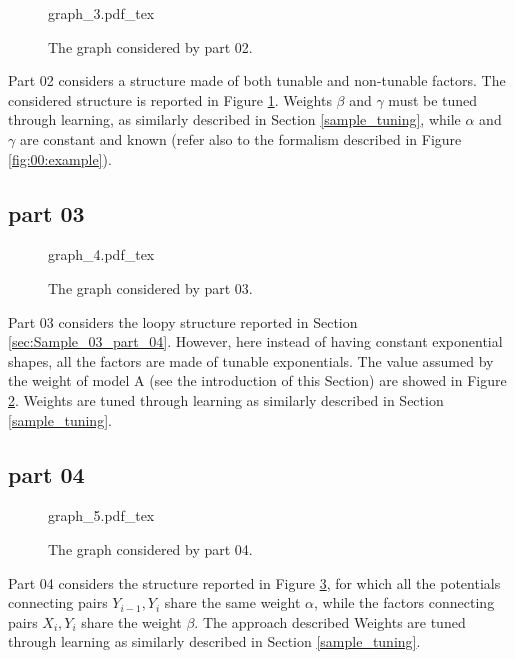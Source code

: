 \begin{figure}
	\centering
\def\svgwidth{0.5 \textwidth}
{graph_3.pdf_tex} 
\caption{The graph considered by part 02.}
\label{fig:sample_06:1}
\end{figure}

Part 02 considers a structure made of both tunable and non-tunable factors. The considered structure is reported in Figure \ref{fig:sample_06:1}.
Weights $\beta$ and $\gamma$ must be tuned through learning, as similarly described in Section \ref{sample_tuning}, while $\alpha$ and $\gamma$ are constant and known (refer also to the formalism described in Figure \ref{fig:00:example}).

\subsection{part 03}

\begin{figure}
	\centering
\def\svgwidth{0.75 \textwidth}
{graph_4.pdf_tex} 
\caption{The graph considered by part 03.}
\label{fig:sample_06:2}
\end{figure}

Part 03 considers the loopy structure reported in Section \ref{sec:Sample_03_part_04}. However, here instead of having constant exponential shapes, all the factors are made of tunable exponentials. The value assumed by the weight of model A (see the introduction of this Section) are showed in Figure \ref{fig:sample_06:2}.
Weights are tuned through learning as similarly described in Section \ref{sample_tuning}.

\subsection{part 04}

\begin{figure}
	\centering
\def\svgwidth{0.45 \textwidth}
{graph_5.pdf_tex} 
\caption{The graph considered by part 04.}
\label{fig:sample_06:3}
\end{figure}

Part 04 considers the structure reported in Figure \ref{fig:sample_06:3}, for which all the potentials connecting pairs $Y_{i-1}, Y_i$ share the same weight $\alpha$, while the factors connecting pairs $X_i,Y_i$ share the weight $\beta$. The approach described
Weights are tuned through learning as similarly described in Section \ref{sample_tuning}.

